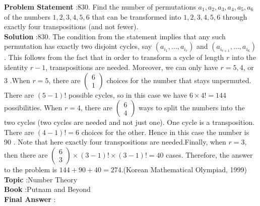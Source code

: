 \documentclass[10pt]{article}
\begin{document}
\textbf{Problem Statement} :830. Find the number of permutations $a_{1}, a_{2}, a_{3}, a_{4}, a_{5}, a_{6}$ of the numbers $1,2,3,4,5,6$ that can be transformed into $1,2,3,4,5,6$ through exactly four transpositions (and not fewer).\\
\textbf{Solution} :830. The condition from the statement implies that any such permutation has exactly two disjoint cycles, say $\left(a_{i_{1}}, \ldots, a_{i_{r}}\right)$ and $\left(a_{i_{r+1}}, \ldots, a_{i_{6}}\right)$. This follows from the fact that in order to transform a cycle of length $r$ into the identity $r-1$, transpositions are needed. Moreover, we can only have $r=5,4$, or 3 .When $r=5$, there are $\left(\begin{array}{l}6 \\ 1\end{array}\right)$ choices for the number that stays unpermuted. There are $(5-1) !$ possible cycles, so in this case we have $6 \times 4 !=144$ possibilities. When $r=4$, there are $\left(\begin{array}{l}6 \\ 4\end{array}\right)$ ways to split the numbers into the two cycles (two cycles are needed and not just one). One cycle is a transposition. There are $(4-1) !=6$ choices for the other. Hence in this case the number is 90 . Note that here exactly four transpositions are needed.Finally, when $r=3$, then there are $\left(\begin{array}{l}6 \\ 3\end{array}\right) \times(3-1) ! \times(3-1) !=40$ cases. Therefore, the answer to the problem is $144+90+40=274$.(Korean Mathematical Olympiad, 1999)\\
\textbf{Topic} :Number Theory\\
\textbf{Book} :Putnam and Beyond\\
\textbf{Final Answer} :\\
\end{document}
